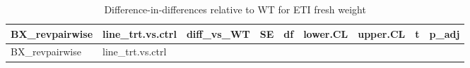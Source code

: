 \documentclass[
  10pt,
]{article}
\begin{document}
\begin{longtable}[]{@{}
  >{\raggedright\arraybackslash}p{}
  >{\raggedright\arraybackslash}p{}
  >{\raggedleft\arraybackslash}p{}
  >{\raggedleft\arraybackslash}p{}
  >{\raggedleft\arraybackslash}p{}
  >{\raggedleft\arraybackslash}p{}
  >{\raggedleft\arraybackslash}p{}
  >{\raggedleft\arraybackslash}p{}
  >{\raggedleft\arraybackslash}p{}@{}}
\caption{Difference-in-differences relative to WT for ETI fresh
weight}\tabularnewline
\toprule\noalign{}
\begin{minipage}[b]{\linewidth}\raggedright
BX\_revpairwise
\end{minipage} & \begin{minipage}[b]{\linewidth}\raggedright
line\_trt.vs.ctrl
\end{minipage} & \begin{minipage}[b]{\linewidth}\raggedleft
diff\_vs\_WT
\end{minipage} & \begin{minipage}[b]{\linewidth}\raggedleft
SE
\end{minipage} & \begin{minipage}[b]{\linewidth}\raggedleft
df
\end{minipage} & \begin{minipage}[b]{\linewidth}\raggedleft
lower.CL
\end{minipage} & \begin{minipage}[b]{\linewidth}\raggedleft
upper.CL
\end{minipage} & \begin{minipage}[b]{\linewidth}\raggedleft
t
\end{minipage} & \begin{minipage}[b]{\linewidth}\raggedleft
p\_adj
\end{minipage} \\
\midrule\noalign{}
\endfirsthead
\toprule\noalign{}
\begin{minipage}[b]{\linewidth}\raggedright
BX\_revpairwise
\end{minipage} & \begin{minipage}[b]{\linewidth}\raggedright
line\_trt.vs.ctrl
\end{minipage} & \begin{minipage}[b]{\linewidth}\raggedleft

\end{minipage}
\end{longtable}
\end{document}
